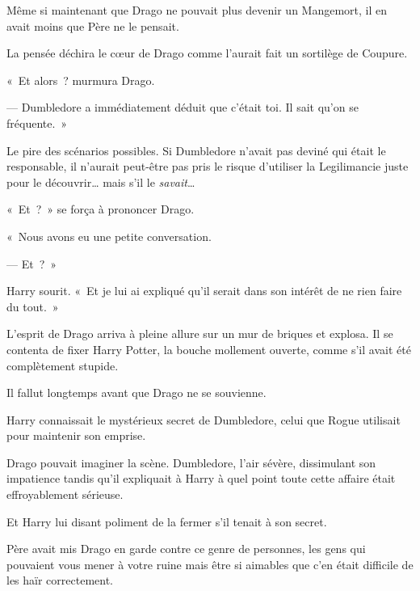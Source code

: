 Même si maintenant que Drago ne pouvait plus devenir un Mangemort, il en avait moins que Père ne le pensait.

La pensée déchira le cœur de Drago comme l'aurait fait un sortilège de Coupure.

«~Et alors~? murmura Drago.

--- Dumbledore a immédiatement déduit que c'était toi. Il sait qu'on se fréquente.~»

Le pire des scénarios possibles. Si Dumbledore n'avait pas deviné qui était le responsable, il n'aurait peut-être pas pris le risque d'utiliser la Legilimancie juste pour le découvrir… mais s'il le \emph{savait}…

«~Et~?~» se força à prononcer Drago.

«~Nous avons eu une petite conversation.

--- Et~?~»

Harry sourit. «~Et je lui ai expliqué qu'il serait dans son intérêt de ne rien faire du tout.~»

L'esprit de Drago arriva à pleine allure sur un mur de briques et explosa. Il se contenta de fixer Harry Potter, la bouche mollement ouverte, comme s'il avait été complètement stupide.

Il fallut longtemps avant que Drago ne se souvienne.

Harry connaissait le mystérieux secret de Dumbledore, celui que Rogue utilisait pour maintenir son emprise.

Drago pouvait imaginer la scène. Dumbledore, l'air sévère, dissimulant son impatience tandis qu'il expliquait à Harry à quel point toute cette affaire était effroyablement sérieuse.

Et Harry lui disant poliment de la fermer s'il tenait à son secret.

Père avait mis Drago en garde contre ce genre de personnes, les gens qui pouvaient vous mener à votre ruine mais être si aimables que c'en était difficile de les haïr correctement.

